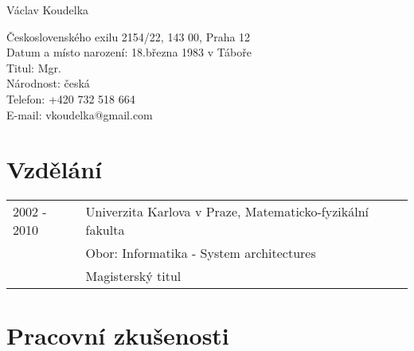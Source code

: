 \documentclass[11pt,letterpaper]{article}
\def\name{Václav Koudelka}
\begin{document}
{\huge \name}


\vspace{0.25in}

\begin{minipage}[t]{0.8\textwidth} 
  Československého exilu 2154/22, 143 00, Praha 12\\
  Datum a místo narození: 18.března 1983 v Táboře \\
  Titul: Mgr. \\
  Národnost: česká \\
  Telefon: +420 732 518 664 \\
  E-mail: vkoudelka@gmail.com \\
\end{minipage}

\section*{Vzdělání}

\begin{tabular}{lll}
2002 - 2010 & Univerzita Karlova v Praze, Matematicko-fyzikální fakulta \\
      & Obor: Informatika - System architectures \\
      & Magisterský titul      
\end{tabular}

\section*{Pracovní zkušenosti}
\end{document}
